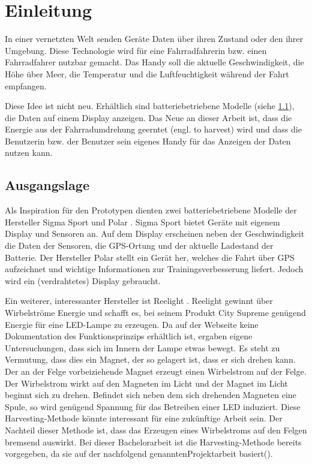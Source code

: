 \chapter{Einleitung}

In einer vernetzten Welt senden Geräte Daten über ihren Zustand oder den ihrer Umgebung. Diese Technologie wird für eine Fahrradfahrerin bzw. einen Fahrradfahrer nutzbar gemacht. Das Handy soll die aktuelle Geschwindigkeit, die Höhe über Meer, die Temperatur und die Luftfeuchtigkeit während der Fahrt empfangen.

Diese Idee ist nicht neu. Erhältlich sind batteriebetriebene Modelle (siehe \ref{ausgang}), die Daten auf einem Display anzeigen. Das Neue an dieser Arbeit ist, dass die Energie aus der Fahrradumdrehung geerntet (engl. to harvest) wird und dass die Benutzerin bzw. der Benutzer sein eigenes Handy für das Anzeigen der Daten nutzen kann.


\section{Ausgangslage}
\label{ausgang}

Als Inspiration für den Prototypen dienten zwei batteriebetriebene Modelle der Hersteller Sigma Sport  und Polar . Sigma Sport bietet Geräte mit eigenem Display und  Sensoren an. Auf dem Display erscheinen neben der Geschwindigkeit die Daten der Sensoren, die GPS-Ortung und der aktuelle Ladestand der Batterie. Der Hersteller Polar stellt ein Gerät her, welches die Fahrt über GPS aufzeichnet und wichtige Informationen zur Trainingsverbesserung liefert. Jedoch wird ein (verdrahtetes) Display gebraucht.

Ein weiterer, interessanter Hersteller ist Reelight  . Reelight gewinnt über Wirbelströme Energie und schafft es, bei seinem Produkt City Supreme genügend Energie für eine LED-Lampe zu erzeugen. Da auf der Webseite keine Dokumentation des Funktionsprinzips erhältlich ist, ergaben eigene Untersuchungen, dass sich im Innern der Lampe \glqq etwas\grqq \medskip {} bewegt. Es steht zu Vermutung, dass dies ein Magnet, der so gelagert ist, dass er sich drehen kann. Der an der Felge vorbeiziehende Magnet erzeugt einen Wirbelstrom auf der Felge. Der Wirbelstrom wirkt auf den Magneten im Licht und der Magnet im Licht beginnt sich zu drehen. Befindet sich neben dem sich drehenden Magneten eine Spule, so wird genügend Spannung für das Betreiben einer LED induziert. Diese Harvesting-Methode könnte interessant für eine zukünftige Arbeit sein. Der Nachteil dieser Methode ist, dass das Erzeugen eines Wirbelstroms auf den Felgen bremsend auswirkt.  Bei dieser Bachelorarbeit ist die Harvesting-Methode bereits vorgegeben, da sie auf der nachfolgend genanntenProjektarbeit basiert(\cite{PA_bicycle}).

